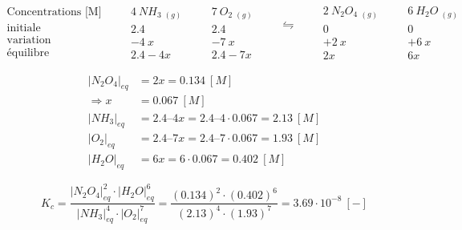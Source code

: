 \documentclass[
  11pt,
  a4paper,
  openany]{book}
\begin{document}
\begin{Answer}
\[
\begin{split}
  \text{Concentrations [M]} &\\
  \text{initiale} &\\
  \text{variation} &\\
  \text{équilibre} &
\end{split}
\quad
\begin{split}
  4\ NH_3\ _{(g)} &\\
  2.4 &\\
  -4\ x &\\
  2.4 - 4x &
\end{split}
\quad
\begin{split}
  7\ O_2\ _{(g)} &\\
  2.4 &\\
  -7\ x &\\
  2.4 - 7x &
\end{split}
\quad
\begin{split}
  \leftrightharpoons &\\
  ~ &\\
  ~ &\\
  ~ &
\end{split}
\quad
\begin{split}
  2\ N_2O_4\ _{(g)}\\
  0 &\\
  +2\ x &\\
  2x &
\end{split}
\quad
\begin{split}
  6\ H_2O\ _{(g)}\\
  0 &\\
  +6\ x &\\
  6x &
\end{split}
\]

\[
  \begin{split}
  |N_2O_4|_{eq} &= 2x = 0.134\ [M] \\
  \Rightarrow x &= 0.067\ [M] \\
  |NH_3|_{eq} &= 2.4 – 4x = 2.4 – 4 \cdot 0.067 = 2.13\ [M] \\ 
  |O_2|_{eq} &= 2.4 – 7x = 2.4 – 7 \cdot 0.067 = 1.93\ [M] \\ 
  |H_2O|_{eq} &= 6x = 6 \cdot 0.067 = 0.402\ [M]
  \end{split}
\]

\[
  K_{c} = \frac{|N_2O_4|^{2}_{eq} \cdot |H_2O|^{6}_{eq}}{|NH_3|^{4}_{eq} \cdot |O_2|^{7}_{eq}}
  = \frac{(0.134)^2 \cdot (0.402)^{6}}{(2.13)^{4} \cdot (1.93)^{7}} = 3.69 \cdot 10^{−8}\ [-]
\]

\end{Answer}
\end{document}

